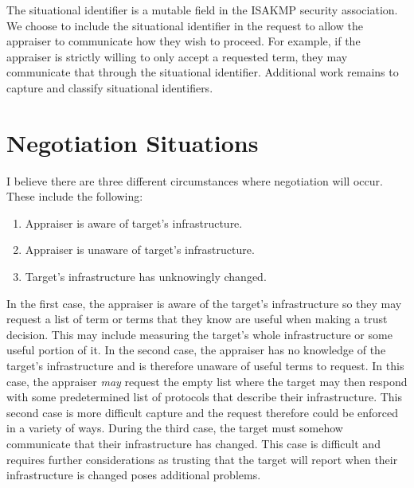 \documentclass[12pt, letterpaper]{article}
\newcommand{\squash}{\itemsep=0pt\parskip=0pt}
\begin{document}
The situational identifier is a mutable field in the ISAKMP security association. We choose to include the situational identifier in the request to allow the appraiser to communicate how they wish to proceed. For example, if the appraiser is strictly willing to only accept a requested term, they may communicate that through the situational identifier. Additional work remains to capture and classify situational identifiers.

\section*{Negotiation Situations}

I believe there are three different circumstances where negotiation will occur. These include the following:

\begin{enumerate}
    \squash
    \item Appraiser is aware of target's infrastructure. 
    \item Appraiser is unaware of target's infrastructure. 
    \item Target's infrastructure has unknowingly changed. 
\end{enumerate}

In the first case, the appraiser is aware of the target's infrastructure so they may request a list of term or terms that they know are useful when making a trust decision. This may include measuring the target's whole infrastructure or some useful portion of it. In the second case, the appraiser has no knowledge of the target's infrastructure and is therefore unaware of useful terms to request. In this case, the appraiser \emph{may} request the empty list where the target may then respond with some predetermined list of protocols that describe their infrastructure. This second case is more difficult capture and the request therefore could be enforced in a variety of ways. During the third case, the target must somehow communicate that their infrastructure has changed. This case is difficult and requires further considerations as trusting that the target will report when their infrastructure is changed poses additional problems. 
\end{document}
